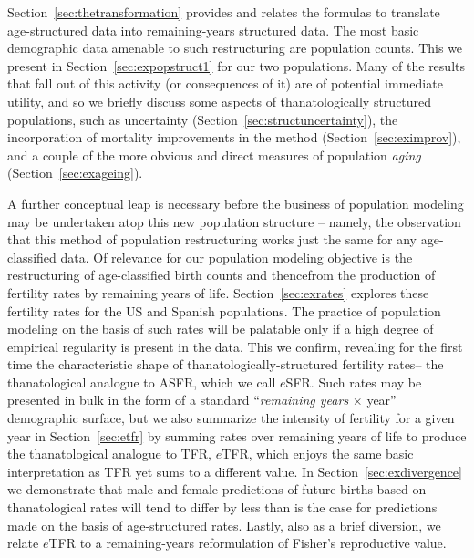 Section~\ref{sec:thetransformation} provides and relates the formulas to
translate age-structured data into remaining-years structured data. The most
basic demographic data amenable to such restructuring are population counts.
This we present in Section~\ref{sec:expopstruct1} for our two populations.
Many of the results that fall out of this activity (or consequences of it) are
of potential immediate utility, and so we briefly discuss some aspects of
thanatologically structured populations, such as uncertainty
(Section~\ref{sec:structuncertainty}), the incorporation of mortality
improvements in the method (Section~\ref{sec:eximprov}), and a couple of
the more obvious and direct measures of population \textit{aging}
(Section~\ref{sec:exageing}).

A further conceptual leap is necessary before the business of population
modeling may be undertaken atop this new population structure -- namely, the
observation that this method of population restructuring works just the same for any age-classified data. Of
relevance for our population modeling objective is the restructuring of
age-classified birth counts and thencefrom the production of fertility rates by
remaining years of life. Section~\ref{sec:exrates} explores these fertility
rates for the US and Spanish populations. The practice of population modeling
on the basis of such rates will be palatable only if a high degree of empirical
regularity is present in the data. This we confirm, revealing for the first
time the characteristic shape of thanatologically-structured fertility rates--
the thanatological analogue to ASFR, which we call $e$SFR. Such rates may be
presented in bulk in the form of a standard ``\textit{remaining years} $\times$
year'' demographic surface, but we also summarize the intensity of fertility
for a given year in Section~\ref{sec:etfr} by summing rates over remaining years of life to produce
the thanatological analogue to TFR, $e$TFR, which enjoys the
same basic interpretation as TFR yet sums to a different value. In
Section~\ref{sec:exdivergence} we demonstrate that male and female predictions
of future births based on thanatological rates will tend to differ by less than 
is the case for predictions made on the basis of age-structured rates. Lastly,
also as a brief diversion, we relate $e$TFR to a remaining-years reformulation
of Fisher's reproductive value.

